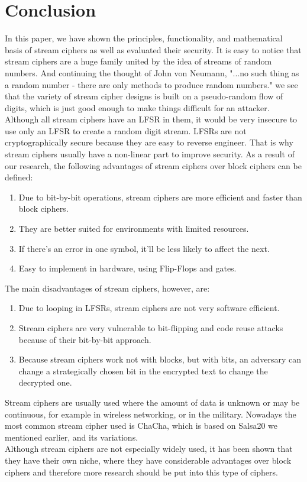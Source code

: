 \section{Conclusion}
In this paper, we have shown the principles, functionality, and mathematical basis of stream ciphers as well as evaluated their security. It is easy to notice that stream ciphers are a huge family united by the idea of streams of random numbers. And continuing the thought of John von Neumann, "...no such thing as a random number - there are only methods to produce random numbers." \cite[p.~36]{vonNeumann1951} we see that the variety of stream cipher designs is built on a pseudo-random flow of digits, which is just good enough to make things difficult for an attacker. Although all stream ciphers have an LFSR in them, it would be very insecure to use only an LFSR to create a random digit stream. LFSRs are not cryptographically secure because they are easy to reverse engineer. That is why stream ciphers usually have a non-linear part to improve security. As a result of our research, the following advantages of stream ciphers over block ciphers can be defined:
\begin{enumerate}
	\setlength\itemsep{0.1em}
	\item Due to bit-by-bit operations, stream ciphers are more efficient and faster than block ciphers.
	\item They are better suited for environments with limited resources. 
	\item If there’s an error in one symbol, it’ll be less likely to affect the next.
	\item Easy to implement in hardware, using Flip-Flops and gates.
\end{enumerate}
\vspace{0.2cm}
The main disadvantages of stream ciphers, however, are:
\begin{enumerate}
	\setlength\itemsep{0.1em}
	\item Due to looping in LFSRs, stream ciphers are not very software efficient.
	\item Stream ciphers are very vulnerable to bit-flipping and code reuse attacks because of their bit-by-bit approach. 
	\item Because stream ciphers work not with blocks, but with bits, an adversary can change a strategically chosen bit in the encrypted text to change the decrypted one.
\end{enumerate}

\vspace{0.1cm}
Stream ciphers are usually used where the amount of data is unknown or may be continuous, for example in wireless networking, or in the military. Nowadays the most common stream cipher used is ChaCha, which is based on Salsa20 we mentioned earlier, and its variations. \\
Although stream ciphers are not especially widely used, it has been shown that they have their own niche, where they have considerable advantages over block ciphers and therefore more research should be put into this type of ciphers.
\clearpage